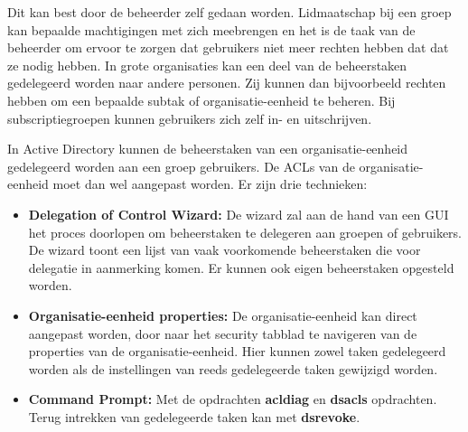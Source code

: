 \begin{enumerate}
{			 }
		
		{ 
			Dit kan best door de beheerder zelf gedaan worden. Lidmaatschap bij een groep kan bepaalde machtigingen met zich meebrengen en het is de taak van de beheerder om ervoor te zorgen dat gebruikers niet meer rechten hebben dat dat ze nodig hebben. In grote organisaties kan een deel van de beheerstaken gedelegeerd worden naar andere personen. Zij kunnen dan bijvoorbeeld rechten hebben om een bepaalde subtak of organisatie-eenheid te beheren. Bij subscriptiegroepen kunnen gebruikers zich zelf in- en uitschrijven.
		}
		
		 { 
			In Active Directory kunnen de beheerstaken van een organisatie-eenheid gedelegeerd worden aan een groep gebruikers. De ACLs van de organisatie-eenheid moet dan wel aangepast worden. Er zijn drie technieken:
			\begin{itemize}
				\item \textbf{Delegation of Control Wizard:} De wizard zal aan de hand van een GUI het proces doorlopen om beheerstaken te delegeren aan groepen of gebruikers. De wizard toont een lijst van vaak voorkomende beheerstaken die voor delegatie in aanmerking komen. Er kunnen ook eigen beheerstaken opgesteld worden.
				\item \textbf{Organisatie-eenheid properties:} De organisatie-eenheid kan direct aangepast worden, door naar het security tabblad te navigeren van de properties van de organisatie-eenheid. Hier kunnen zowel taken gedelegeerd worden als de instellingen van reeds gedelegeerde taken gewijzigd worden.
				\item \textbf{Command Prompt:} Met de opdrachten \textbf{acldiag} en \textbf{dsacls} opdrachten. Terug intrekken van gedelegeerde taken kan met \textbf{dsrevoke}.
			\end{itemize}
		}
	\end{enumerate}